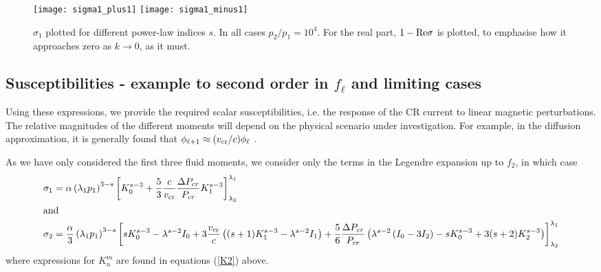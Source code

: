 \documentclass[a4paper,fleqn,usenatbib]{mnras}
\begin{document}
 

\begin{figure}
	\begin{center}
		\texttt{[image: sigma1\_plus1]}
		\texttt{[image: sigma1\_minus1]}
	\end{center}
	\caption{
		$\sigma_1$ plotted for different power-law indices $s$. In all cases  $p_2/p_1 = 10^4$. 
		For the real part, $1-{\rm Re}\sigma$ is plotted, to emphasise how it approaches zero as $k\rightarrow 0$, as it must. 
	}
	\label{fig:A1}
\end{figure}


 \subsection{Susceptibilities - example to second order in $f_\ell$ and limiting cases}
 
Using these expressions, we provide the required scalar susceptibilities, i.e. the response of the CR current to linear magnetic perturbations. The relative magnitudes of the different moments will depend on the physical scenario under investigation. For example, in the diffusion approximation, it is generally found that $\phi_{\ell+1} \approx (v_{\rm cr}/c)\phi_{\ell}$ \cite[e.g.][]{JokipiiWilliams}.

As we have only considered the first three fluid moments, we consider only the terms in the Legendre expansion up to $f_2$, in which case
\begin{align}
&\sigma_1 =\alpha \left(\lambda_1 p_1\right)^{3-s}\left[ K_0^{s-3} + \frac{5}{3} \frac{c}{v_{\rm cr}}\frac{\Delta P_{cr}}{P_{cr}} K_1^{s-3}\right]_{\lambda_2}^{\lambda_1} \nonumber \\
&{\rm  and}  \label{Eq:sigma2} \\
&\sigma_2  =  \frac{\alpha}{3}  \left(\lambda_1 p_1\right)^{3-s}\left[  
s K_0^{s-3} - \lambda^{s-2} I_0  +  3 \frac{v_{\rm cr}}{c}  \left( (s+1) K_1^{s-3}-\lambda^{s-2} I_1\right) 
+ \frac{5}{6} \frac{\Delta P_{cr}}{P_{cr}} 
 \left(  \lambda^{s-2} \left(I_0   -3I_2 \right)- s  K_0^{s-3} +3(s+2) K_2^{s-3} \right) 
 \right]_{\lambda_2}^{\lambda_1} \nonumber
\end{align}
where expressions for $K_n^m$ are found in equations (\ref{K2}) above.  
\end{document}
